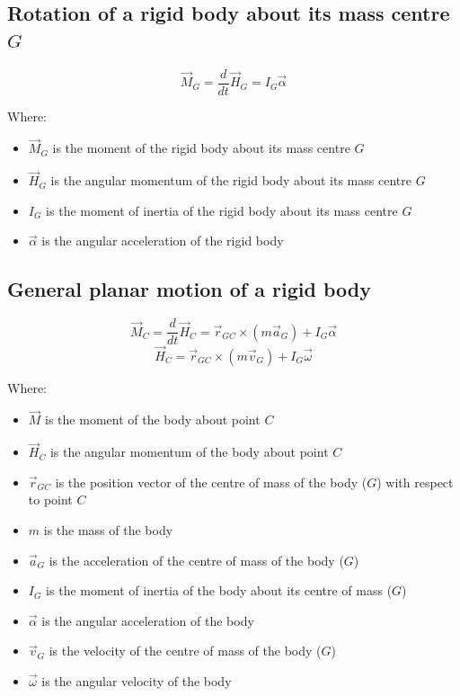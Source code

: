 \documentclass[11pt]{article}
\begin{document}
\subsection{Rotation of a rigid body about its mass centre \(G\)}
\label{sec:org31ae17b}
\[\vec{M}_G = \frac{d}{dt} \vec{H}_G = I_G \vec{\alpha}\]

Where:
\begin{itemize}
\item \(\vec{M}_G\) is the moment of the rigid body about its mass centre \(G\)
\item \(\vec{H}_G\) is the angular momentum of the rigid body about its mass centre \(G\)
\item \(I_G\) is the moment of inertia of the rigid body about its mass centre \(G\)
\item \(\vec{\alpha}\) is the angular acceleration of the rigid body
\end{itemize}

\subsection{General planar motion of a rigid body}
\label{sec:org910d15b}
\[\vec{M}_C = \frac{d}{dt} \vec{H}_C = \vec{r}_{GC} \times (m \vec{a}_G) + I_G \vec{\alpha}\]
\[\vec{H}_C = \vec{r}_{GC} \times (m \vec{v}_G) + I_{G} \vec{\omega}\]

Where:
\begin{itemize}
\item \(\vec{M}\) is the moment of the body about point \(C\)
\item \(\vec{H}_C\) is the angular momentum of the body about point \(C\)
\item \(\vec{r}_{GC}\) is the position vector of the centre of mass of the body (\(G\)) with respect to point \(C\)
\item \(m\) is the mass of the body
\item \(\vec{a}_G\) is the acceleration of the centre of mass of the body (\(G\))
\item \(I_G\) is the moment of inertia of the body about its centre of mass (\(G\))
\item \(\vec{\alpha}\) is the angular acceleration of the body
\item \(\vec{v}_G\) is the velocity of the centre of mass of the body (\(G\))
\item \(\vec{\omega}\) is the angular velocity of the body
\end{itemize}
\end{document}
